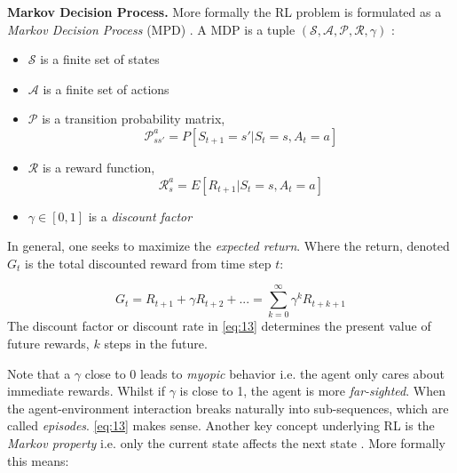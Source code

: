 \documentclass{kththesis}
\theoremstyle{definition}
\begin{document}
 \textbf{Markov Decision Process.} More formally the RL problem is formulated as a \textit{Markov Decision Process} (MPD) \parencite{sutton1998reinforcement, li2017deep}. A MDP is a tuple $(\mathcal{S, A, P, R}, \gamma)$ \parencite{li2017deep}:
\begin{itemize}
    \item $\mathcal{S}$ is a finite set of states
    \item $\mathcal{A}$ is a finite set of actions
    \item $\mathcal{P}$ is a transition probability matrix, 
    \begin{equation} 
        \label{eq:12a}
        \mathcal{P}^{a}_{ss'} = P[S_{t+1} = s' | S_t =s, A_t = a]
    \end{equation}
    \item $\mathcal{R}$ is a reward function, 
    \begin{equation}
        \label{eq:12b}
        \mathcal{R}^{a}_{s} = E[R_{t+1} | S_t =s, A_t=a]
    \end{equation}
    \item $\gamma \in [0,1]$ is a \textit{discount factor} 
\end{itemize}
In general, one seeks to maximize the \textit{expected return}. Where the return, denoted $G_t$ is the total discounted reward from time step $t$:

\begin{equation}
    \label{eq:13}
    G_t = R_{t+1} + \gamma R_{t+2} + ... = \sum_{k=0}^{\infty}{\gamma^{k}R_{t+k+1}}
\end{equation}
The discount factor or discount rate in \autoref{eq:13} determines the present value of future rewards, $k$ steps in the future. 

\newpage
Note that a $\gamma$ close to 0 leads to \textit{myopic} behavior i.e. the agent only cares about immediate rewards. Whilst if $\gamma$ is close to 1, the agent is more \textit{far-sighted}. When the agent-environment interaction breaks naturally into sub-sequences, which are called \textit{episodes}.
\autoref{eq:13} makes sense. Another key concept underlying RL is the \textit{Markov property} i.e. only the current state affects the next state \parencite{arulkumaran2017brief}. More formally this means:
\end{document}
